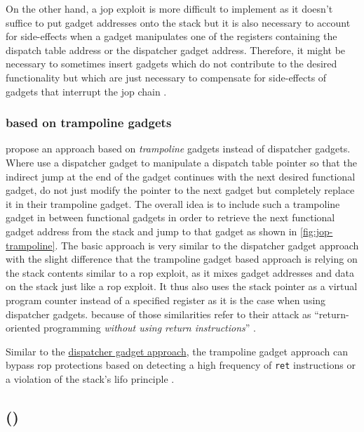 On the other hand, a \gls{jop} exploit is more difficult to implement as it doesn't suffice to put gadget addresses onto the stack but it is also necessary to account for side-effects when a gadget manipulates one of the registers containing the dispatch table address or the dispatcher gadget address.
Therefore, it might be necessary to sometimes insert gadgets which do not contribute to the desired functionality but which are just necessary to compensate for side-effects of gadgets that interrupt the \gls{jop} chain \cite{Bletsch2011}.

\subsubsection{ based on trampoline gadgets}
\label{subsubsec:cr-jop-trampoline}

\citeauthor{Checkoway2010} propose an approach based on \emph{trampoline} gadgets instead of dispatcher gadgets.
Where \citeauthor{Bletsch2011} use a dispatcher gadget to manipulate a dispatch table pointer so that the indirect jump at the end of the gadget continues with the next desired functional gadget, \citeauthor{Checkoway2010} do not just modify the pointer to the next gadget but completely replace it in their trampoline gadget.
The overall idea is to include such a trampoline gadget in between functional gadgets in order to retrieve the next functional gadget address from the stack and jump to that gadget as shown in \cref{fig:jop-trampoline}.
The basic approach is very similar to the dispatcher gadget approach with the slight difference that the trampoline gadget based approach is relying on the stack contents similar to a \gls{rop} exploit, as it mixes gadget addresses and data on the stack just like a \gls{rop} exploit.
It thus also uses the stack pointer as a virtual program counter instead of a specified register as it is the case when using dispatcher gadgets.
\citeauthor{Checkoway2010} because of those similarities refer to their attack as ``return-oriented programming \textit{without using return instructions}'' \cite{Checkoway2010}.

Similar to the \hyperref[subsubsec:cr-jop-dispatcher]{dispatcher gadget approach}, the trampoline gadget approach can bypass \gls{rop} protections based on detecting a high frequency of \texttt{ret} instructions or a violation of the stack's \gls{lifo} principle \cite{Checkoway2010}.

\subsection{ ()}
\label{subsec:cr-cop}

